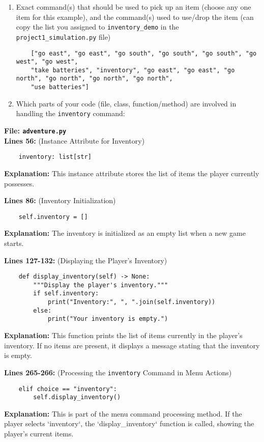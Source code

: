 \documentclass[11pt]{article}
\begin{document}
\begin{enumerate}
    \item Exact command(s) that should be used to pick up an item (choose any one item for this example), and the
    command(s) used to use/drop the item (can copy the list you assigned to \texttt{inventory\_demo} in the
    \texttt{project1\_simulation.py} file)
    \begin{verbatim}
    ["go east", "go east", "go south", "go south", "go south", "go west", "go west",
    "take batteries", "inventory", "go east", "go east", "go north", "go north", "go north", "go north",
    "use batteries"]
    \end{verbatim}
    \item Which parts of your code (file, class, function/method) are involved in handling the \texttt{inventory}
    command:
\end{enumerate}

\textbf{File: \texttt{adventure.py}}\\

\noindent\textbf{Lines 56:} (Instance Attribute for Inventory)
\begin{verbatim}
    inventory: list[str]
\end{verbatim}
\textbf{Explanation:} This instance attribute stores the list of items the player currently possesses.

\noindent\textbf{Lines 86:} (Inventory Initialization)
\begin{verbatim}
    self.inventory = []
\end{verbatim}
\textbf{Explanation:} The inventory is initialized as an empty list when a new game starts.

\noindent\textbf{Lines 127-132:} (Displaying the Player's Inventory)
\begin{verbatim}
    def display_inventory(self) -> None:
        """Display the player's inventory."""
        if self.inventory:
            print("Inventory:", ", ".join(self.inventory))
        else:
            print("Your inventory is empty.")
\end{verbatim}
\textbf{Explanation:} This function prints the list of items currently in the player's inventory. If no items are
present, it displays a message stating that the inventory is empty.

\noindent\textbf{Lines 265-266:} (Processing the \texttt{inventory} Command in Menu Actions)
\begin{verbatim}
    elif choice == "inventory":
        self.display_inventory()
\end{verbatim}
\textbf{Explanation:} This is part of the menu command processing method. If the player selects `inventory`, the
`display\_inventory` function is called, showing the player's current items.
\end{document}
